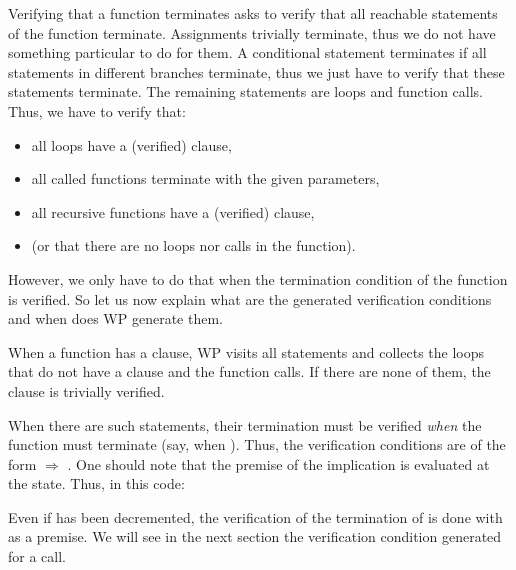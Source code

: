 


Verifying that a function terminates asks to verify that all reachable
statements of the function terminate. Assignments trivially terminate, thus
we do not have something particular to do for them. A conditional statement
terminates if all statements in different branches terminate, thus we just
have to verify that these statements terminate. The remaining statements are
loops and function calls. Thus, we have to verify that:



\begin{itemize}
  \item all loops have a (verified)  clause,
  \item all called functions terminate with the given parameters,
  \item all recursive functions have a (verified)  clause,
  \item (or that there are no loops nor calls in the function).
\end{itemize}



However, we only have to do that when the termination condition of the function
is verified. So let us now explain what are the generated verification
conditions and when does WP generate them.



When a function has a  clause, WP visits all statements
and collects the loops that do not have a  clause and
the function calls. If there are none of them, the 
clause is trivially verified.






When there are such statements, their termination must be verified {\em when}
the function must terminate (say, when ). Thus, the verification
conditions are of the form
 $\Rightarrow$ .
One should note that the premise of the implication is evaluated at the
 state. Thus, in this code:






Even if  has been decremented, the verification of the
termination of  is done with
 as a premise. We will see in the
next section the verification condition generated for a call.




